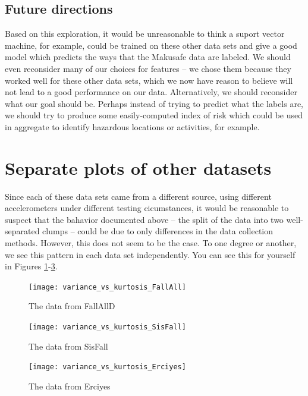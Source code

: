 \documentclass{article}
\begin{document}
\subsection{Future directions}
Based on this exploration, it would be unreasonable to think a suport vector machine, for example, could be trained on these other data sets and give a good model which predicts the ways that the Makusafe data are labeled. We should even reconsider many of our choices for features -- we chose them because they worked well for these other data sets, which we now have reason to believe will not lead to a good performance on our data. Alternatively, we should reconsider what our goal should be. Perhaps instead of trying to predict what the labels are, we should try to produce some easily-computed index of risk which could be used in aggregate to identify hazardous locations or activities, for example.


\appendix

\section{Separate plots of other datasets} \label{other_set_plots}

Since each of these data sets came from a different source, using different accelerometers under different testing cicumstances, it would be reasonable to suspect that the bahavior documented above -- the split of the data into two well-separated clumps -- could be due to only differences in the data collection methods. However, this does not seem to be the case. To one degree or another, we see this pattern in each data set independently. You can see this for yourself in Figures \ref{fallalld}-\ref{erciyes}.


\begin{figure}
\texttt{[image: variance\_vs\_kurtosis\_FallAll]}
\caption{The data from FallAllD}
\label{fallalld}
\end{figure}
\begin{figure}
\texttt{[image: variance\_vs\_kurtosis\_SisFall]}
\caption{The data from SisFall}
\label{sisfall}
\end{figure}
\begin{figure}
\texttt{[image: variance\_vs\_kurtosis\_Erciyes]}
\caption{The data from Erciyes}
\label{erciyes}
\end{figure}
\end{document}
